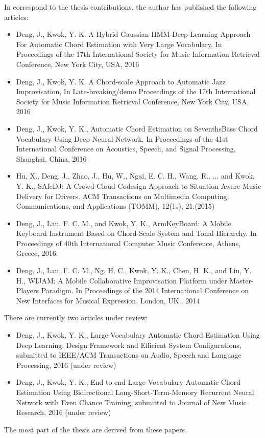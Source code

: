 In correspond to the thesis contributions, the author has published the following articles:
\begin{itemize}
\item Deng, J., Kwok, Y. K. A Hybrid Gaussian-HMM-Deep-Learning Approach For Automatic Chord Estimation with Very Large Vocabulary, In Proceedings of the 17th International Society for Music Information Retrieval Conference, New York City, USA, 2016
\item Deng, J., Kwok, Y. K. A Chord-scale Approach to Automatic Jazz Improvisation, In Late-breaking/demo Proceedings of the 17th International Society for Music Information Retrieval Conference, New York City, USA, 2016
\item Deng, J., Kwok, Y. K., Automatic Chord Estimation on SeventhsBass Chord Vocabulary Using Deep Neural Network, In Proceedings of the 41st International Conference on Acoustics, Speech, and Signal Processing, Shanghai, China, 2016
\item Hu, X., Deng, J., Zhao, J., Hu, W., Ngai, E. C. H., Wang, R., ... and Kwok, Y. K., SAfeDJ: A Crowd-Cloud Codesign Approach to Situation-Aware Music Delivery for Drivers. ACM Transactions on Multimedia Computing, Communications, and Applications (TOMM), 12(1s), 21.(2015)
\item Deng, J., Lau, F. C. M., and Kwok, Y. K., ArmKeyBoard: A Mobile Keyboard Instrument Based on Chord-Scale System and Tonal Hierarchy. In Proceedings of 40th International Computer Music Conference, Athens, Greece, 2016.
\item Deng, J., Lau, F. C. M., Ng, H. C., Kwok, Y. K., Chen, H. K., and Liu, Y. H., WIJAM: A Mobile Collaborative Improvisation Platform under Master-Players Paradigm. In Proceedings of the 2014 International Conference on New Interfaces for Musical Expression, London, UK., 2014
\end{itemize}

There are currently two articles under review:
\begin{itemize}
\item Deng, J., Kwok, Y. K., Large Vocabulary Automatic Chord Estimation Using Deep Learning: Design Framework and Efficient System Configurations, submitted to IEEE/ACM Transactions on Audio, Speech and Language Processing, 2016 (under review)
\item Deng, J., Kwok, Y. K., End-to-end Large Vocabulary Automatic Chord Estimation Using Bidirectional Long-Short-Term-Memory Recurrent Neural Network with Even Chance Training, submitted to Journal of New Music Research, 2016 (under review)
\end{itemize}
The most part of the thesis are derived from these papers.

